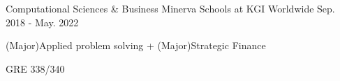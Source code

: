 \begin{cventries}
  \cventry
    {Computational Sciences \& Business}
    {Minerva Schools at KGI}
    {Worldwide}
    {Sep. 2018 - May. 2022}
    {
      \begin{cvitems}
        \item {(Major)Applied problem solving + (Major)Strategic Finance}
        \item {GRE 338/340}
      \end{cvitems}
    }
\end{cventries}
